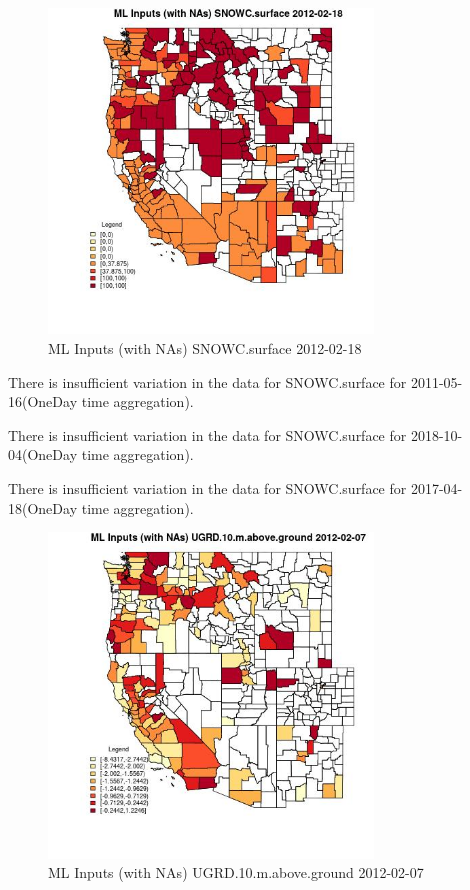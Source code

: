 \begin{figure} 
\centering  
\includegraphics[width=0.77\textwidth]{Code_Outputs/Report_ML_input_PM25_Step4_part_f_de_duplicated_aveswNAs_CountySNOWCsurfaceMean2012-02-18.jpg} 
\caption{\label{fig:Report_ML_input_PM25_Step4_part_f_de_duplicated_aveswNAsCountySNOWCsurfaceMean2012-02-18}ML Inputs (with NAs) SNOWC.surface 2012-02-18} 
\end{figure} 
 

There is insufficient variation in the data for SNOWC.surface for 2011-05-16(OneDay time aggregation). 
 

There is insufficient variation in the data for SNOWC.surface for 2018-10-04(OneDay time aggregation). 
 

There is insufficient variation in the data for SNOWC.surface for 2017-04-18(OneDay time aggregation). 
 

\begin{figure} 
\centering  
\includegraphics[width=0.77\textwidth]{Code_Outputs/Report_ML_input_PM25_Step4_part_f_de_duplicated_aveswNAs_CountyUGRD10mabovegroundMean2012-02-07.jpg} 
\caption{\label{fig:Report_ML_input_PM25_Step4_part_f_de_duplicated_aveswNAsCountyUGRD10mabovegroundMean2012-02-07}ML Inputs (with NAs) UGRD.10.m.above.ground 2012-02-07} 
\end{figure} 
 

